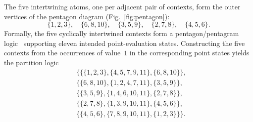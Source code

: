 \documentclass{article}
\begin{document}
The five intertwining atoms, one per adjacent pair of contexts, form
the outer vertices of the pentagon diagram (Fig.~\ref{fig:pentagon}):
\[
\{1,2,3\},\quad
\{6,8,10\},\quad
\{3,5,9\},\quad
\{2,7,8\},\quad
\{4,5,6\}.
\]
Formally, the five cyclically intertwined contexts form a
pentagon/pentagram logic~\cite[p.~267, Fig.~2]{wright:pent}
supporting eleven intended point-evaluation states. Constructing the
five contexts from the occurrences of value~$1$ in the corresponding
point states yields the partition logic
\begin{equation}
\begin{aligned}
&\{
 \{ \{ 1,2,3\} ,\{ 4,5,7,9,11\} ,\{ 6,8,10\} \} ,\\
&\{ \{ 6,8,10\} ,\{ 1,2,4,7,11\} ,\{ 3,5,9\} \} ,\\
&\{ \{ 3,5,9\} ,\{ 1,4,6,10,11\} ,\{ 2,7,8\} \} ,\\
&\{ \{ 2,7,8\} ,\{ 1,3,9,10,11\} ,\{ 4,5,6\} \} ,\\
&\{ \{ 4,5,6\} ,\{ 7,8,9,10,11\} ,\{ 1,2,3\} \}
\}.
\end{aligned}
\label{2018-e-plpentagon}
\end{equation}
\end{document}
